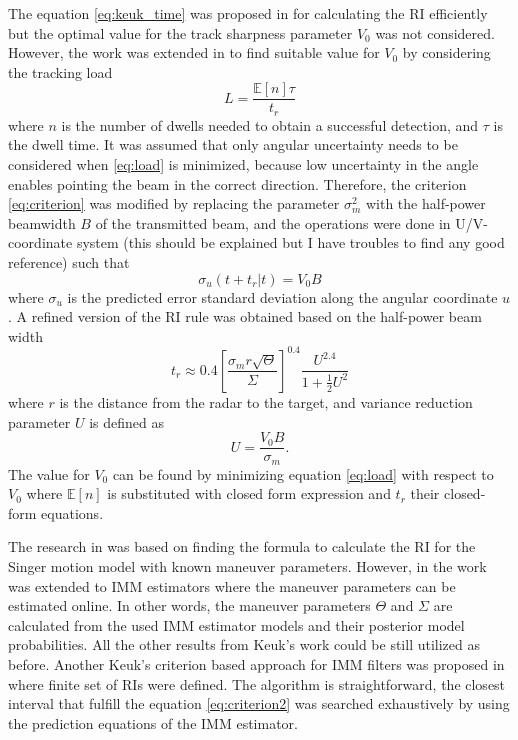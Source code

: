\documentclass[english, 12pt, a4paper, elec, utf8, a-1b, online]{aaltothesis}
\newcommand{\E}[1]{\mathbb{E}\left[ #1 \right]}
\begin{document}
The equation \eqref{eq:keuk_time} was proposed in \cite{Keuk1975} for calculating the RI efficiently but the optimal value for the track sharpness parameter $V_0$ was not considered.
However, the work was extended in \cite{vanKeuk1993} to find suitable value for $V_0$ by considering the tracking load
\begin{equation}\label{eq:load}
    L = \frac{\E{n} \tau}{t_r}
\end{equation}
where $n$ is the number of dwells needed to obtain a successful detection, and $\tau$ is the dwell time.
It was assumed that only angular uncertainty needs to be considered when \eqref{eq:load} is minimized, 
because low uncertainty in the angle enables pointing the beam in the correct direction.
Therefore, the criterion \eqref{eq:criterion} was modified by replacing the parameter $\sigma_m^2$ with the half-power beamwidth $B$ of the transmitted beam, and the operations were done in U/V-coordinate system {\color{red}(this should be explained but I have troubles to find any good reference)} such that
\begin{equation} \label{eq:criterion2}
    \sigma_u(t + t_r | t) = V_0 B
\end{equation}
where $\sigma_u$ is the predicted error standard deviation along the angular coordinate $u$. 
A refined version of the RI rule was obtained based on the half-power beam width
\begin{equation}\label{eq:van_keuk_revisited}
    t_r \approx 0.4 \left[ \frac{\sigma_m r \sqrt{\Theta}}{\Sigma} \right]^{0.4} \frac{U^{2.4}}{1+\frac{1}{2}U^2}
\end{equation}
where $r$ is the distance from the radar to the target, and variance reduction parameter $U$ is defined as
\begin{equation}
    U = \frac{V_0 B}{\sigma_m}.
\end{equation}
The value for $V_0$ can be found by minimizing equation \eqref{eq:load} with respect to $V_0$ where $\E{n}$ is substituted with closed form expression and $t_r$  their closed-form equations.

The research in \cite{Keuk1975, vanKeuk1993} was based on finding the formula to calculate the RI for the Singer motion model with known maneuver parameters.
However, in \cite{Shin1995} the work was extended to IMM estimators where the maneuver parameters can be estimated online.
In other words, the maneuver parameters $\Theta$ and $\Sigma$ are calculated from the used IMM estimator models and their posterior model probabilities.
All the other results from Keuk's work could be still utilized as before.
Another Keuk's criterion based approach for IMM filters was proposed in \cite{Daeipour1994} where finite set of RIs were defined.
The algorithm is straightforward, the closest interval that fulfill the equation \eqref{eq:criterion2} was searched exhaustively by using the prediction equations of the IMM estimator.
\end{document}
